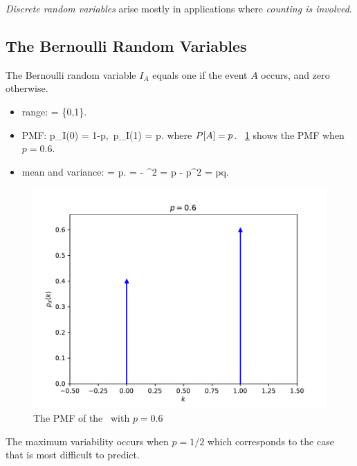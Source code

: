 	\item
	\emph{Discrete random variables} arise mostly in applications
	where \emph{counting is involved}.
\eit

\subsection{The Bernoulli Random Variables}
\bit
	\item The Bernoulli random variable $I_A$
	equals one if the event $A$ occurs,
	and zero otherwise.

	\begin{itemize}
		\item range:
			\ssx = \{0,1\}.
		\eeql
		\item PMF:
			p_I(0) = 1-p,\ 
			p_I(1) = p.
		\eeql
		where $P[A] = p$.
		\figurename~\ref{fig-bernoulli-pmf} shows the PMF when $p=0.6$.

		\item mean and variance:
			 = p.
		\eeql
			 =  - ^2
			= p - p^2 = pq.
		\eeql
	\end{itemize}
	\begin{figure}\begin{center}
	\includegraphics[width=.7\linewidth]{figures/bernoulli_pmf}
	\caption{The PMF of the \bernrv\ with $p=0.6$}
	\label{fig-bernoulli-pmf}
	\end{center}\end{figure}

	\item The maximum variability occurs when $p = 1/2$
	which corresponds to the case that is most difficult to predict.

\eit

